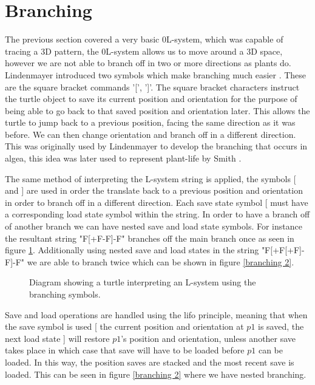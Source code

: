 \section{Branching} \label{branching}

\begin{flushleft}

The previous section covered a very basic 0L-system, which was capable of tracing a 3D pattern, the 0L-system allows us to move around a 3D space, however we are not able to branch off in two or more directions as plants do. Lindenmayer introduced two symbols which make branching much easier \cite{lindenmayer1968mathematical}. These are the square bracket commands '[', ']'. The square bracket characters instruct the turtle object to save its current position and orientation for the purpose of being able to go back to that saved position and orientation later. This allows the turtle to jump back to a previous position, facing the same direction as it was before. We can then change orientation and branch off in a different direction. This was originally used by Lindenmayer to develop the branching that occurs in algea, this idea was later used to represent plant-life by Smith \cite{smith1984plants}. \\

\vspace{5mm}

The same method of interpreting the L-system string is applied, the symbols [ and ] are used in order the translate back to a previous position and orientation in order to branch off in a different direction. Each save state symbol [ must have a corresponding load state symbol within the string. In order to have a branch off of another branch we can have nested save and load state symbols. For instance the resultant string "F[+F-F]-F" branches off the main branch once as seen in figure \ref{branching 1}. Additionally using nested save and load states in the string "F[+F[+F]-F]-F" we are able to branch twice which can be shown in figure \ref{branching 2}.

\begin{figure}[htbp]
	{\centering
		\setlength{\fboxrule}{1pt}
		\vspace{7px}
		\caption{Diagram showing a turtle interpreting an L-system using the branching symbols.} \label{branching 1}
	}
\end{figure}
\FloatBarrier

Save and load operations are handled using the \acrfull{lifo} principle, meaning that when the save symbol is used [ the current position and orientation at $p1$ is saved, the next load state ] will restore $p1$'s position and orientation, unless another save takes place in which case that save will have to be loaded before $p1$ can be loaded. In this way, the position saves are stacked and the most recent save is loaded. This can be seen in figure \ref{branching 2} where we have nested branching. \\


\end{flushleft}
